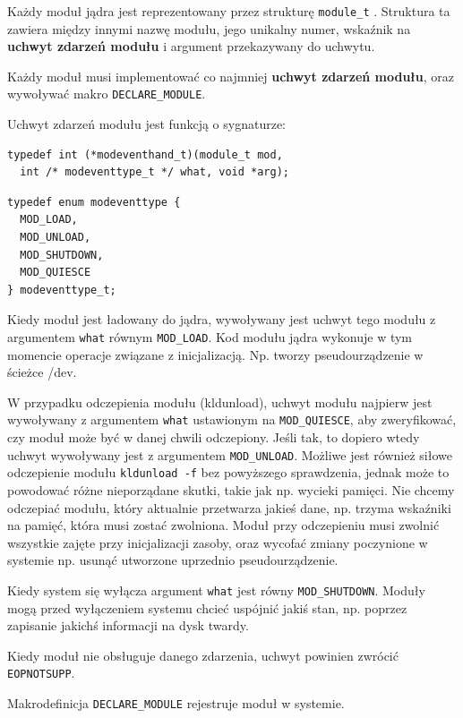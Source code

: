 \documentclass[shortabstract,inz]{iithesis}
\begin{document}
Każdy moduł jądra jest reprezentowany przez strukturę \texttt{module\_t} \cite{man:module_9}.
Struktura ta zawiera między innymi nazwę modułu, jego unikalny numer, wskaźnik na \textbf{uchwyt
zdarzeń modułu} i argument przekazywany do uchwytu.

Każdy moduł musi implementować co najmniej \textbf{uchwyt zdarzeń modułu},
oraz wywoływać makro \texttt{DECLARE\_MODULE}.

Uchwyt zdarzeń modułu jest funkcją o sygnaturze:
\begin{lstlisting}
typedef int (*modeventhand_t)(module_t mod, 
  int /* modeventtype_t */ what, void *arg);
\end{lstlisting}

\begin{lstlisting}[caption=Zdarzenia związane z modułami]
typedef enum modeventtype {
  MOD_LOAD,
  MOD_UNLOAD,
  MOD_SHUTDOWN,
  MOD_QUIESCE
} modeventtype_t;
\end{lstlisting}

Kiedy moduł jest ładowany do jądra, wywoływany jest uchwyt tego modułu z
argumentem \texttt{what} równym \texttt{MOD\_LOAD}. Kod modułu jądra wykonuje
w tym momencie operacje związane z inicjalizacją. Np. tworzy pseudourządzenie
w ścieżce /dev.


W przypadku odczepienia modułu (kldunload), uchwyt modułu najpierw jest wywoływany z
argumentem \texttt{what} ustawionym na \texttt{MOD\_QUIESCE}, aby zweryfikować,
czy moduł może być w danej chwili odczepiony. Jeśli tak, to dopiero wtedy
uchwyt wywoływany jest z argumentem \texttt{MOD\_UNLOAD}. Możliwe jest również
siłowe odczepienie modułu \texttt{kldunload -f} bez powyższego sprawdzenia, jednak może to powodować
różne nieporządane skutki, takie jak np. wycieki pamięci. Nie chcemy odczepiać modułu,
który aktualnie przetwarza jakieś dane, np. trzyma wskaźniki na pamięć, która musi zostać
zwolniona.
Moduł przy odczepieniu musi zwolnić wszystkie zajęte przy inicjalizacji zasoby, oraz
wycofać zmiany poczynione w systemie np. usunąć utworzone uprzednio pseudourządzenie.

Kiedy system się wyłącza argument \texttt{what} jest równy \texttt{MOD\_SHUTDOWN}.
Moduły mogą przed wyłączeniem systemu chcieć uspójnić jakiś stan, np. poprzez
zapisanie jakichś informacji na dysk twardy.

Kiedy moduł nie obsługuje danego zdarzenia, uchwyt powinien zwrócić \texttt{EOPNOTSUPP}.


Makrodefinicja \texttt{DECLARE\_MODULE} rejestruje moduł w systemie.
\end{document}
